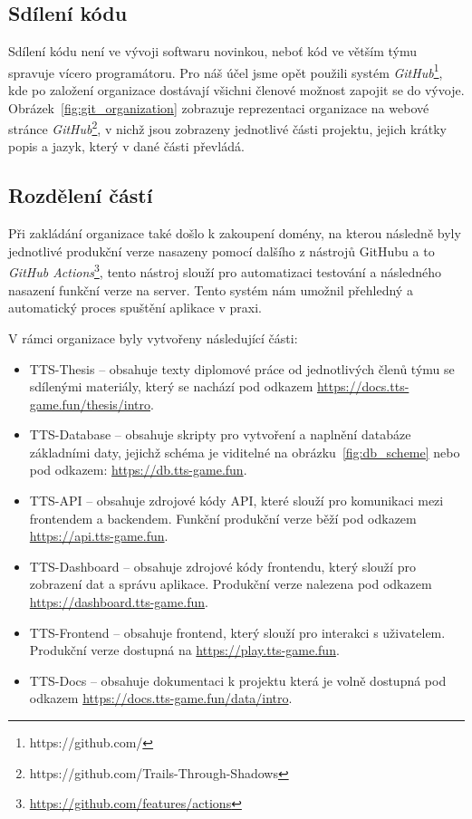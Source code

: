 \subsection{Sdílení kódu}
\label{subsec:implementation-collaboration-sharing}
Sdílení kódu není ve vývoji softwaru novinkou, neboť kód ve větším týmu spravuje vícero programátoru. Pro náš účel jsme opět použili systém \textit{GitHub}\footnote{https://github.com/}, kde po založení organizace dostávají všichni členové možnost zapojit se do vývoje. Obrázek~\ref{fig:git_organization} zobrazuje reprezentaci organizace na webové stránce \textit{GitHub}\footnote{https://github.com/Trails-Through-Shadows}, v nichž jsou zobrazeny jednotlivé části projektu, jejich krátky popis a jazyk, který v dané části převládá.

\subsection*{Rozdělení částí}
\label{subsec:implementation-collaboration-sharing-parts}
Při zakládání organizace také došlo k zakoupení domény, na kterou následně byly jednotlivé produkční verze nasazeny pomocí dalšího z nástrojů GitHubu a to \textit{GitHub Actions}\footnote{\href{https://github.com/features/actions}{https://github.com/features/actions}}, tento nástroj slouží pro automatizaci testování a následného nasazení funkční verze na server. Tento systém nám umožnil přehledný a automatický proces spuštění aplikace v praxi.

\noindent
V rámci organizace byly vytvořeny následující části:

\begin{itemize}
    \item TTS-Thesis    -- obsahuje texty diplomové práce od jednotlivých členů týmu se sdílenými materiály, který se nachází pod odkazem  \url{https://docs.tts-game.fun/thesis/intro}.
    \item TTS-Database  -- obsahuje skripty pro vytvoření a naplnění databáze základními daty, jejichž schéma je viditelné na obrázku~\ref{fig:db_scheme} nebo pod odkazem: \url{https://db.tts-game.fun}.
    \item TTS-API       -- obsahuje zdrojové kódy API, které slouží pro komunikaci mezi frontendem a backendem. Funkční produkční verze běží pod odkazem \url{https://api.tts-game.fun}.
    \item TTS-Dashboard -- obsahuje zdrojové kódy frontendu, který slouží pro zobrazení dat a správu aplikace. Produkční verze nalezena pod odkazem \url{https://dashboard.tts-game.fun}.
    \item TTS-Frontend  -- obsahuje frontend, který slouží pro interakci s uživatelem. Produkční verze dostupná na \url{https://play.tts-game.fun}.
    \item TTS-Docs      -- obsahuje dokumentaci k projektu která je volně dostupná pod odkazem \url{https://docs.tts-game.fun/data/intro}.
\end{itemize}

